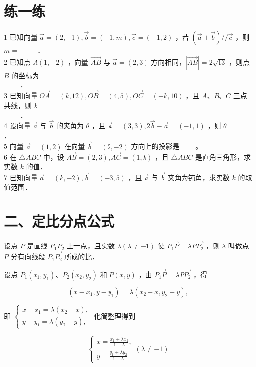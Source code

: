 \documentclass[10pt]{article}
\begin{document}
\section*{练一练}
1 已知向量 \(\vec{a}=(2,-1), \vec{b}=(-1, m), \vec{c}=(-1,2)\) ，若 \((\vec{a}+\vec{b}) / / \vec{c}\) ，则 \(m=\) \(\qquad\) ．\\
2 已知点 \(A(1,-2)\) ，向量 \(\overrightarrow{A B}\) 与 \(\vec{a}=(2,3)\) 方向相同，\(|\overrightarrow{A B}|=2 \sqrt{13}\) ，则点 \(B\) 的坐标为\\
\(\qquad\) ．\\
3 已知向量 \(\overrightarrow{O A}=(k, 12), \overrightarrow{O B}=(4,5), \overrightarrow{O C}=(-k, 10)\) ，且 \(A 、 B 、 C\) 三点共线，则 \(k=\)\\
\(\qquad\) ．\\
4 设向量 \(\vec{a}\) 与 \(\vec{b}\) 的夹角为 \(\theta\) ，且 \(\vec{a}=(3,3), 2 \vec{b}-\vec{a}=(-1,1)\) ，则 \(\theta=\) \(\qquad\) ．\\
5 向量 \(\vec{a}=(1,2)\) 在向量 \(\vec{b}=(2,-2)\) 方向上的投影是 \(\qquad\)。\\
6 在 \(\triangle A B C\) 中，设 \(\overrightarrow{A B}=(2,3), \overrightarrow{A C}=(1, k)\) ，且 \(\triangle A B C\) 是直角三角形，求实数 \(k\) 的值．\\
7 已知向量 \(\vec{a}=(k,-2), \vec{b}=(-3,5)\) ，且 \(\vec{a}\) 与 \(\vec{b}\) 夹角为钝角，求实数 \(k\) 的取值范围．

\section*{二、定比分点公式}
设点 \(P\) 是直线 \(P_{1} P_{2}\) 上一点，且实数 \(\lambda(\lambda \neq-1)\) 使 \(\overrightarrow{P_{1} P}=\lambda \overrightarrow{P P_{2}}\) ，则 \(\lambda\) 叫做点 \(P\) 分有向线段 \(\overrightarrow{P_{1} P_{2}}\) 所成的比．

设点 \(P_{1}\left(x_{1}, y_{1}\right) 、 P_{2}\left(x_{2}, y_{2}\right)\) 和 \(P(x, y)\) ，由 \(\overrightarrow{P_{1} P}=\lambda \overrightarrow{P P_{2}}\) ，得

\[
\left(x-x_{1}, y-y_{1}\right)=\lambda\left(x_{2}-x, y_{2}-y\right),
\]

即 \(\left\{\begin{array}{l}x-x_{1}=\lambda\left(x_{2}-x\right), \\ y-y_{1}=\lambda\left(y_{2}-y\right),\end{array}\right.\) 化简整理得到

\[
\left\{\begin{array}{l}
x=\frac{x_{1}+\lambda x_{2}}{1+\lambda}, \\
y=\frac{y_{1}+\lambda y_{2}}{1+\lambda}
\end{array}(\lambda \neq-1)\right.
\]
\end{document}

